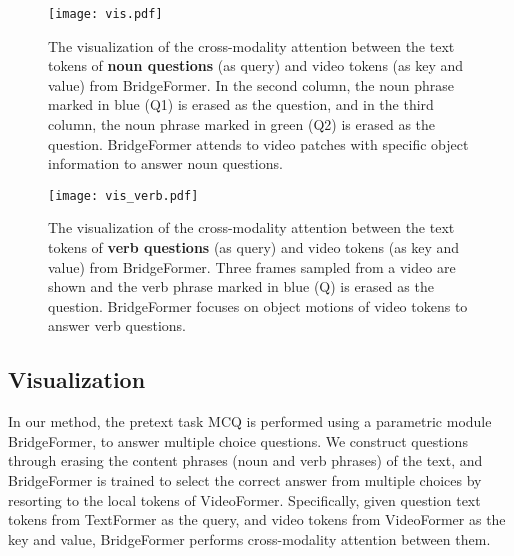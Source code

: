 \documentclass[10pt,twocolumn,letterpaper]{article}
\begin{document}
\begin{figure}
	\centering
	\texttt{[image: vis.pdf]}
	\vspace{-6mm}
	\caption{The visualization of the cross-modality attention between the text tokens of \textbf{noun questions} (as query) and video tokens (as key and value) from BridgeFormer. In the second column, the noun phrase marked in blue (Q1) is erased as the question, and in the third column, the noun phrase marked in green (Q2) is erased as the question. BridgeFormer attends to video patches with specific object information to answer noun questions.}
	\label{fig:vis}
	\vspace{-6mm}	
\end{figure}

\begin{figure}
	\centering
	\texttt{[image: vis\_verb.pdf]}
	\vspace{-6mm}
	\caption{The visualization of the cross-modality attention between the text tokens of \textbf{verb questions} (as query) and video tokens (as key and value) from BridgeFormer. Three frames sampled from a video are shown and the verb phrase marked in blue (Q) is erased as the question. BridgeFormer focuses on object motions of video tokens to answer verb questions.}
	\label{fig:verb}
	\vspace{0mm}	
\end{figure}

\subsection{Visualization}
In our method, the pretext task MCQ is performed using a parametric module BridgeFormer, to answer multiple choice questions. We construct questions through erasing the content phrases (\ie noun and verb phrases) of the text, and BridgeFormer is trained to select the correct answer from multiple choices by resorting to the local tokens of VideoFormer. Specifically, given question text tokens from TextFormer as the query, and video tokens from VideoFormer as the key and value, BridgeFormer performs cross-modality attention between them. 
\end{document}
